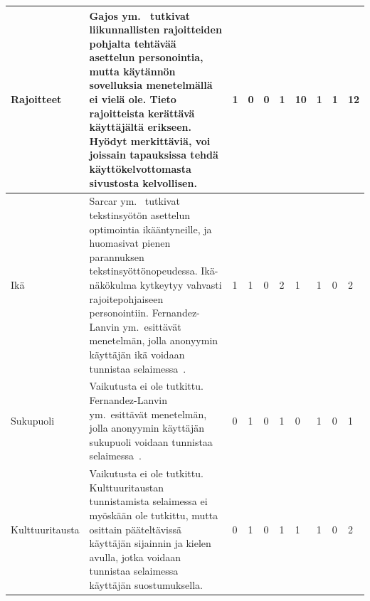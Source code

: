 \documentclass[finnish, 12pt, a4paper, elec, utf8, a-1b, online]{aaltothesis}
\begin{document}
{\begin{longtable}{p{2.5cm}|p{6cm}|p{0.5cm}p{0.5cm}p{0.5cm}|p{0.5cm}|p{0.5cm}p{0.5cm}p{0.5cm}|p{0.5cm}|}
    \midrule
    Rajoitteet                              & Gajos ym.~\cite{10.1145/1357054.1357250} tutkivat liikunnallisten rajoitteiden pohjalta tehtävää asettelun personointia, mutta käytännön sovelluksia menetelmällä ei vielä ole. Tieto rajoitteista kerättävä käyttäjältä erikseen. Hyödyt merkittäviä, voi joissain tapauksissa tehdä käyttökelvottomasta sivustosta kelvollisen.                                       & 1                                          & 0                                   & 0                                      & 1                            & 10                                              & 1                                         & 1                                         & 12                           \\
    \midrule
    Ikä                                     & Sarcar ym.~\cite{10.1145/2996267.2996275} tutkivat tekstinsyötön asettelun optimointia ikääntyneille, ja huomasivat pienen parannuksen tekstinsyöttönopeudessa. Ikä-näkökulma kytkeytyy vahvasti rajoitepohjaiseen personointiin. Fernandez-Lanvin ym.\ esittävät menetelmän, jolla anonyymin käyttäjän ikä voidaan tunnistaa selaimessa~\cite{fernandez2018dimension}. & 1                                          & 1                                   & 0                                      & 2                            & 1                                               & 1                                         & 0                                         & 2                            \\
    \midrule
    Sukupuoli                               & Vaikutusta ei ole tutkittu. Fernandez-Lanvin ym.\ esittävät menetelmän, jolla anonyymin käyttäjän sukupuoli voidaan tunnistaa selaimessa~\cite{fernandez2018dimension}.                                                                                                                                                                                                 & 0                                          & 1                                   & 0                                      & 1                            & 0                                               & 1                                         & 0                                         & 1                            \\
    \midrule
    Kulttuuritausta                         & Vaikutusta ei ole tutkittu. Kulttuuritaustan tunnistamista selaimessa ei myöskään ole tutkittu, mutta osittain pääteltävissä käyttäjän sijainnin ja kielen avulla, jotka voidaan tunnistaa selaimessa käyttäjän suostumuksella.                                                                                                                                         & 0                                          & 1                                   & 0                                      & 1                            & 1                                               & 1                                         & 0                                         & 2                            \\

\end{longtable}}
\end{document}
